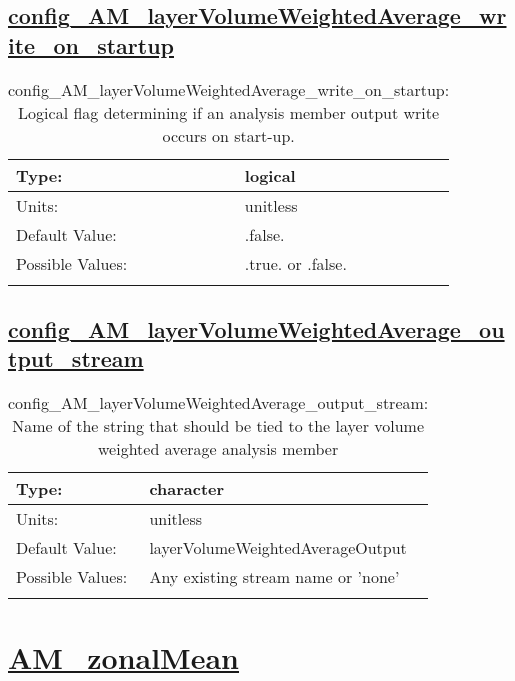 \subsection[config\_AM\_layerVolumeWeightedAverage\_write\_on\_startup]{\hyperref[sec:nm_tab_AM_layerVolumeWeightedAverage]{config\_AM\_layerVolumeWeightedAverage\_write\_on\_startup}}
\label{subsec:nm_sec_config_AM_layerVolumeWeightedAverage_write_on_startup}
\begin{center}
\begin{longtable}{| p{2.0in} || p{4.0in} |}
    \hline
    Type: & logical \\
    \hline
    Units: & \si{unitless} \\
    \hline
    Default Value: & .false. \\
    \hline
    Possible Values: & .true. or .false. \\
    \hline
    \caption{config\_AM\_layerVolumeWeightedAverage\_write\_on\_startup: Logical flag determining if an analysis member output write occurs on start-up.}
\end{longtable}
\end{center}
\subsection[config\_AM\_layerVolumeWeightedAverage\_output\_stream]{\hyperref[sec:nm_tab_AM_layerVolumeWeightedAverage]{config\_AM\_layerVolumeWeightedAverage\_output\_stream}}
\label{subsec:nm_sec_config_AM_layerVolumeWeightedAverage_output_stream}
\begin{center}
\begin{longtable}{| p{2.0in} || p{4.0in} |}
    \hline
    Type: & character \\
    \hline
    Units: & \si{unitless} \\
    \hline
    Default Value: & layerVolumeWeightedAverageOutput \\
    \hline
    Possible Values: & Any existing stream name or 'none' \\
    \hline
    \caption{config\_AM\_layerVolumeWeightedAverage\_output\_stream: Name of the string that should be tied to the layer volume weighted average analysis member}
\end{longtable}
\end{center}
\section[AM\_zonalMean]{\hyperref[sec:nm_tab_AM_zonalMean]{AM\_zonalMean}}
\label{sec:nm_sec_AM_zonalMean}
